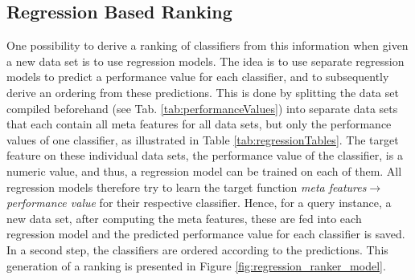 \subsection{Regression Based Ranking}
One possibility to derive a ranking of classifiers from this information when given a new data set is to use regression models. The idea is to use separate regression models to predict a performance value for each classifier, and to subsequently derive an ordering from these predictions. This is done by splitting the data set compiled beforehand (see Tab. \ref{tab:performanceValues}) into separate data sets that each contain all meta features for all data sets, but only the performance values of one classifier, as illustrated in Table \ref{tab:regressionTables}. The target feature on these individual data sets, the performance value of the classifier, is a numeric value, and thus, a regression model can be trained on each of them. All regression models therefore try to learn the target function \textit{meta features}$\rightarrow$\textit{performance value} for their respective classifier. Hence, for a query instance, a new data set, after computing the meta features, these are fed into each regression model and the predicted performance value for each classifier is saved. In a second step, the classifiers are ordered according to the predictions. This generation of a ranking is presented in Figure \ref{fig:regression_ranker_model}.

